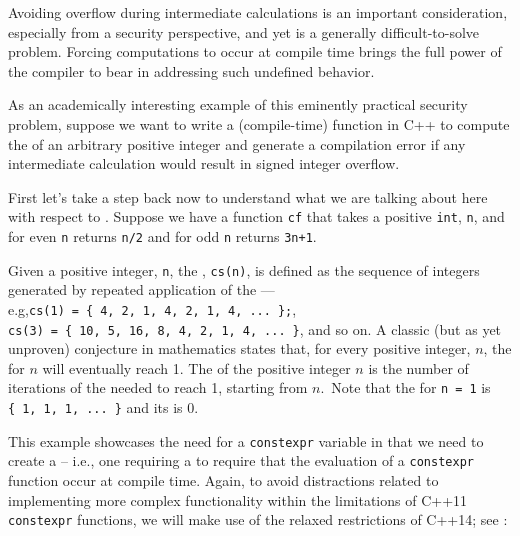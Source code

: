 Avoiding overflow during intermediate calculations is an important
consideration, especially from a security perspective, and yet is a
generally difficult-to-solve problem. Forcing computations to occur at
compile time brings the full power of the compiler to bear in addressing
such undefined behavior.

As an academically interesting example of this eminently practical
security problem, suppose we want to write a (compile-time) function in
C++ to compute the  of an arbitrary positive
integer and generate a compilation error if any intermediate calculation
would result in signed integer overflow.

First let's take a step back now to understand what we are talking about
here with respect to . Suppose we have a function
\lstinline!cf! that takes a positive \lstinline!int!, \lstinline!n!, and for even
\lstinline!n! returns \lstinline!n/2! and for odd \lstinline!n! returns
\lstinline!3n+1!.

    
\noindent Given a positive integer, \lstinline!n!, the ,
\lstinline!cs(n)!, is defined as the sequence of integers generated by
repeated application of the  --- e.g,\linebreak[4]%
 \lstinline!cs(1)!~\lstinline!=!~\lstinline!{!~\lstinline!4,!~\lstinline!2,!~\lstinline!1,!~\lstinline!4,!~\lstinline!2,!~\lstinline!1,!~\lstinline!4,!~\lstinline!...!~\lstinline!};!,
\lstinline!cs(3)!~\lstinline!=!~\lstinline!{!~\lstinline!10,!~\lstinline!5,!~\lstinline!16,!~\lstinline!8,!~\lstinline!4,!~\lstinline!2,!~\lstinline!1,!~\lstinline!4,!~\lstinline!...!~\lstinline!}!,
and so on. A classic (but as yet unproven) conjecture in mathematics
states that, for every positive integer, $n$, the  for $n$ will eventually reach 1. The  of
the positive integer $n$ is the number of iterations of the
 needed to reach 1, starting from $n$.~Note that
the  for \lstinline!n!~\lstinline!=!~\lstinline!1! is
\lstinline!{!~\lstinline!1,!~\lstinline!1,!~\lstinline!1,!~\lstinline!...!~\lstinline!}!
and its  is 0.

This example showcases the need for a \lstinline!constexpr! variable in
that we need to create a  -- i.e., one
requiring a  to require that the
evaluation of a \lstinline!constexpr! function occur at compile time.
Again, to avoid distractions related to implementing more complex
functionality within the limitations of C++11 \lstinline!constexpr!
functions, we will make use of the relaxed restrictions of C++14; see
:

